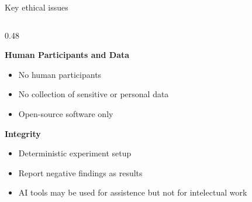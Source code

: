 \documentclass[aspectratio=169,11pt]{beamer}
\begin{document}
\begin{frame}{Key ethical issues}
  \begin{columns}[T,onlytextwidth]
    \begin{column}{0.48\textwidth}
      {\footnotesize
      \textbf{Human Participants and Data}\\[0.5em]
      \begin{itemize}\itemsep0.2em
        \item No human participants
        \item No collection of sensitive or personal data
        \item Open-source software only
      \end{itemize}

      \textbf{Integrity}\\[0.5em]
      \begin{itemize}\itemsep0.2em
        \item Deterministic experiment setup
        \item Report negative findings as results
        \item AI tools may be used for assistence but not for intelectual work
      \end{itemize}}
    \end{column}
  \end{columns}
\end{frame}
\end{document}

